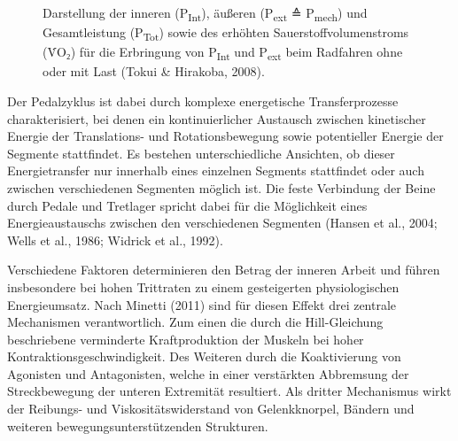 \documentclass[
  letterpaper,
  DIV=11]{scrartcl}
\begin{document}
\begin{figure}


\caption{\label{fig-Pint_Pext}Darstellung der inneren
(P\textsubscript{Int}), äußeren (P\textsubscript{ext} ≙
P\textsubscript{mech}) und Gesamtleistung (P\textsubscript{Tot}) sowie
des erhöhten Sauerstoffvolumenstroms (V̇O₂) für die Erbringung von
P\textsubscript{Int} und P\textsubscript{ext} beim Radfahren ohne oder
mit Last (Tokui \& Hirakoba, 2008).}

\end{figure}%

Der Pedalzyklus ist dabei durch komplexe energetische Transferprozesse
charakterisiert, bei denen ein kontinuierlicher Austausch zwischen
kinetischer Energie der Translations- und Rotationsbewegung sowie
potentieller Energie der Segmente stattfindet. Es bestehen
unterschiedliche Ansichten, ob dieser Energietransfer nur innerhalb
eines einzelnen Segments stattfindet oder auch zwischen verschiedenen
Segmenten möglich ist. Die feste Verbindung der Beine durch Pedale und
Tretlager spricht dabei für die Möglichkeit eines Energieaustauschs
zwischen den verschiedenen Segmenten (Hansen et al., 2004; Wells et al.,
1986; Widrick et al., 1992).

Verschiedene Faktoren determinieren den Betrag der inneren Arbeit und
führen insbesondere bei hohen Trittraten zu einem gesteigerten
physiologischen Energieumsatz. Nach Minetti (2011) sind für diesen
Effekt drei zentrale Mechanismen verantwortlich. Zum einen die durch die
Hill-Gleichung beschriebene verminderte Kraftproduktion der Muskeln bei
hoher Kontraktionsgeschwindigkeit. Des Weiteren durch die Koaktivierung
von Agonisten und Antagonisten, welche in einer verstärkten Abbremsung
der Streckbewegung der unteren Extremität resultiert. Als dritter
Mechanismus wirkt der Reibungs- und Viskositätswiderstand von
Gelenkknorpel, Bändern und weiteren bewegungsunterstützenden Strukturen.
\end{document}
